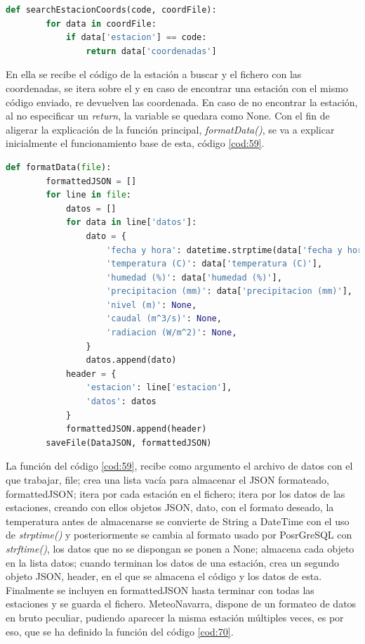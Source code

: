 \begin{lstlisting}[language=Python, caption={Declaración función \textit{searchEstacionCoords()}} usada para formatear los JSON de códigos en CHCantábrico y MeteoNavarra, label=cod:200]
	def searchEstacionCoords(code, coordFile):
		for data in coordFile:
			if data['estacion'] == code:
				return data['coordenadas']
\end{lstlisting}

En ella se recibe el código de la estación a buscar y el fichero con las coordenadas, se itera sobre el y en caso de encontrar una estación con el mismo código enviado, re devuelven las coordenada. En caso de no encontrar la estación, al no especificar un \textit{return}, la variable se quedara como None.\newline
\newline
Con el fin de aligerar la explicación de la función principal, \textit{formatData()}, se va a explicar inicialmente el funcionamiento base de esta, código \ref{cod:59}.

\begin{lstlisting}[language=Python, caption={Declaración función base \textit{formatData()}, concretamente esta versión es usada para formatear los datos de Aemet}, label=cod:59]
	def formatData(file):
		formattedJSON = []
		for line in file:
			datos = []
			for data in line['datos']:
				dato = {
					'fecha y hora': datetime.strptime(data['fecha y hora'], "%d/%m/%Y %H:%M:%S").strftime("%Y-%m-%d %H:%M"),
					'temperatura (C)': data['temperatura (C)'],
					'humedad (%)': data['humedad (%)'],
					'precipitacion (mm)': data['precipitacion (mm)'],
					'nivel (m)': None,
					'caudal (m^3/s)': None,
					'radiacion (W/m^2)': None,
				}
				datos.append(dato)
			header = {
				'estacion': line['estacion'],
				'datos': datos
			}
			formattedJSON.append(header)
		saveFile(DataJSON, formattedJSON)
\end{lstlisting}

La función del código \ref{cod:59}, recibe como argumento el archivo de datos con el que trabajar, file; crea una lista vacía para almacenar el JSON formateado, formattedJSON; itera por cada estación en el fichero; itera por los datos de las estaciones, creando con ellos objetos JSON, dato, con el formato deseado, la temperatura antes de almacenarse se convierte de String a DateTime con el uso de \textit{strptime()} y posteriormente se cambia al formato usado por PosrGreSQL con \textit{strftime()}, los datos que no se dispongan se ponen a None; almacena cada objeto en la lista datos; cuando terminan los datos de una estación, crea un segundo objeto JSON, header, en el que se almacena el código y los datos de esta. Finalmente se incluyen en formattedJSON hasta terminar con todas las estaciones y se guarda el fichero.\newline
\newline
MeteoNavarra, dispone de un formateo de datos en bruto peculiar, pudiendo aparecer la misma estación múltiples veces, es por eso, que se ha definido la función del código \ref{cod:70}.

